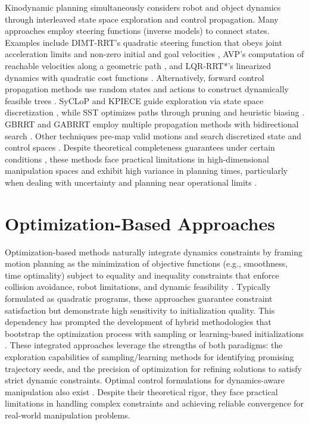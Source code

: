 Kinodynamic planning simultaneously considers robot and object dynamics through interleaved state space exploration and control propagation. Many approaches employ steering functions (inverse models) to connect states. Examples include DIMT-RRT's quadratic steering function that obeys joint acceleration limits and non-zero initial and goal velocities \cite{kunz2014probabilistically}, AVP's computation of reachable velocities along a geometric path \cite{pham2013kinodynamic,johnson2012optimal}, and LQR-RRT*'s linearized dynamics with quadratic cost functions \cite{perez2012lqr,caldwell2018fast}. Alternatively, forward control propagation methods use random states and actions to construct dynamically feasible trees \cite{pasricha2022pokerrt}. SyCLoP and KPIECE guide exploration via state space discretization \cite{plaku2010motion,sucan2011sampling}, while SST optimizes paths through pruning and heuristic biasing \cite{li2016asymptotically}. GBRRT and GABRRT employ multiple propagation methods with bidirectional search \cite{nayak2022bidirectional}. Other techniques pre-map valid motions and search discretized state and control spaces \cite{shome2021asymptotically,bordalba2018randomized}. Despite theoretical completeness guarantees under certain conditions \cite{kleinbort2018probabilistic}, these methods face practical limitations in high-dimensional manipulation spaces and exhibit high variance in planning times, particularly when dealing with uncertainty and planning near operational limits \cite{kingston2018sampling}.

\section{Optimization-Based Approaches}
Optimization-based methods naturally integrate dynamics constraints by framing motion planning as the minimization of objective functions (e.g., smoothness, time optimality) subject to equality and inequality constraints that enforce collision avoidance, robot limitations, and dynamic feasibility \cite{kalakrishnan2011stomp,schulman2013finding,park2012itomp,ichnowski2020gomp}.
Typically formulated as quadratic programs, these approaches guarantee constraint satisfaction but demonstrate high sensitivity to initialization quality. This dependency has prompted the development of hybrid methodologies that bootstrap the optimization process with sampling or learning-based initializations \cite{ichnowski2020deep,kuntz2019fast,yan2024impact}. These integrated approaches leverage the strengths of both paradigms: the exploration capabilities of sampling/learning methods for identifying promising trajectory seeds, and the precision of optimization for refining solutions to satisfy strict dynamic constraints.
Optimal control formulations for dynamics-aware manipulation also exist \cite{arrizabalaga2024slosh,kim2014catching}. Despite their theoretical rigor, they face practical limitations in handling complex constraints and achieving reliable convergence for real-world manipulation problems.


